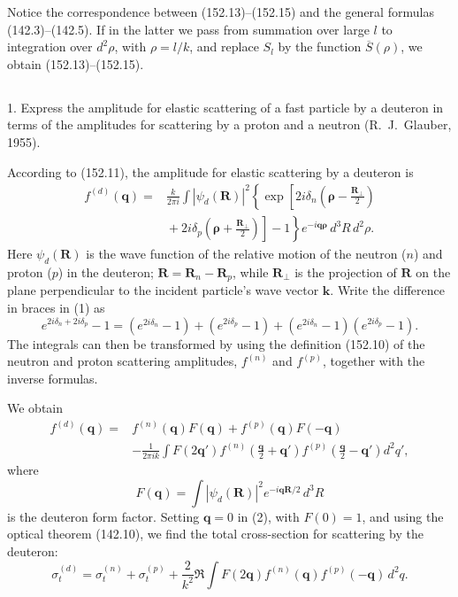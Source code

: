 Notice the correspondence between (152.13)--(152.15) and the general formulas (142.3)--(142.5). If in the latter we pass from summation over large $l$ to integration over $d^2\rho$, with $\rho=l/k$, and replace $S_l$ by the function $\overline S(\rho)$, we obtain (152.13)--(152.15).

\subsection*{\ProblemHeading}

1. Express the amplitude for elastic scattering of a fast particle by a deuteron in terms of the amplitudes for scattering by a proton and a neutron (R.~J.~Glauber, 1955).

\SolutionHeading
According to (152.11), the amplitude for elastic scattering by a deuteron is
\begin{equation}
 \begin{split}
 f^{(d)}(\mathbf q)={}&\frac{k}{2\pi i}\int|\psi_d(\mathbf R)|^2
 \left\{\exp\left[2i\delta_n\left(\boldsymbol\rho-\frac{\mathbf R_\perp}{2}\right)\right.\right.\\
 &\left.\left.{}+2i\delta_p\left(\boldsymbol\rho+\frac{\mathbf R_\perp}{2}\right)\right]-1\right\}
 e^{-i\mathbf q\boldsymbol\rho}\,d^3R\,d^2\rho.
 \end{split}
 \tag{1}
\end{equation}
Here $\psi_d(\mathbf R)$ is the wave function of the relative motion of the neutron ($n$) and proton ($p$) in the deuteron; $\mathbf R=\mathbf R_n-\mathbf R_p$, while $\mathbf R_\perp$ is the projection of $\mathbf R$ on the plane perpendicular to the incident particle's wave vector $\mathbf k$. Write the difference in braces in (1) as
\[
 e^{2i\delta_n+2i\delta_p}-1=(e^{2i\delta_n}-1)+(e^{2i\delta_p}-1)+(e^{2i\delta_n}-1)(e^{2i\delta_p}-1).
\]
The integrals can then be transformed by using the definition (152.10) of the neutron and proton scattering amplitudes, $f^{(n)}$ and $f^{(p)}$, together with the inverse formulas.

We obtain
\begin{equation}
 \begin{split}
 f^{(d)}(\mathbf q)={}&f^{(n)}(\mathbf q)F(\mathbf q)+f^{(p)}(\mathbf q)F(-\mathbf q)\\
 &-\frac1{2\pi ik}\int F(2\mathbf q')f^{(n)}\left(\frac{\mathbf q}{2}+\mathbf q'\right)
 f^{(p)}\left(\frac{\mathbf q}{2}-\mathbf q'\right)d^2q',
 \end{split}
 \tag{2}
\end{equation}
where
\[
 F(\mathbf q)=\int|\psi_d(\mathbf R)|^2e^{-i\mathbf q\mathbf R/2}\,d^3R
\]
is the deuteron form factor. Setting $\mathbf q=0$ in (2), with $F(0)=1$, and using the optical theorem (142.10), we find the total cross-section for scattering by the deuteron:
\begin{equation}
 \sigma_t^{(d)}=\sigma_t^{(n)}+\sigma_t^{(p)}+\frac2{k^2}\Re\int F(2\mathbf q)f^{(n)}(\mathbf q)f^{(p)}(-\mathbf q)\,d^2q.
 \tag{3}
\end{equation}

